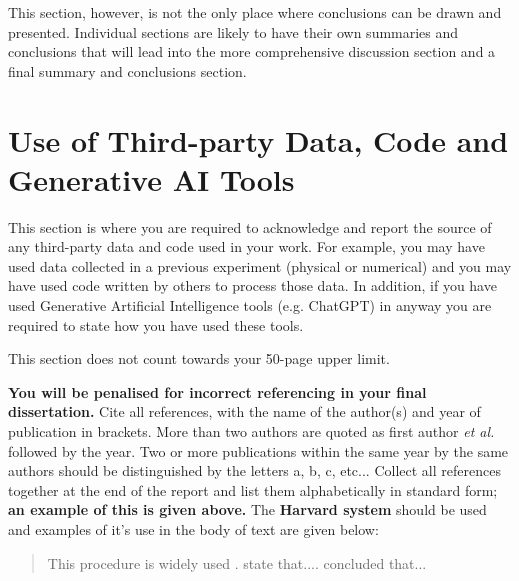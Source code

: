 \documentclass[a4paper,12pt]{article}
\begin{document}
This section, however, is not the only place where conclusions can be drawn and presented.  Individual sections are likely to have their own summaries and conclusions that will lead into the more comprehensive discussion section and a final summary and conclusions section.


\clearpage

\section{Use of Third-party Data, Code and Generative AI Tools}
\label{sec:DCG_Usaage}

This section is where you are required to acknowledge and report the source of any third-party data and code used in your work. For example, you may have used data collected in a previous experiment (physical or numerical) and you may have used code written by others to process those data. In addition, if you have used Generative Artificial Intelligence tools (e.g. ChatGPT) in anyway you are required to state how you have used these tools.

This section does not count towards your 50-page upper limit.

\clearpage





\vspace*{10mm}

\textbf{You will be penalised for incorrect referencing in your final dissertation.} Cite all references, with the name of the author(s) and year of publication in brackets. More than
two authors are quoted as first author \textit{et al.} followed by the year.  Two or more publications within
the same year by the same authors should be distinguished by the letters a, b, c, etc... Collect all
references together at the end of the report and list them alphabetically in standard form; \textbf{an
example of this is given above.} The \textbf{Harvard system} should be used and examples of it’s use in the body of text are given below:


\begin{quote}
This procedure is widely used \citep{Christou2009,Wu2016,Hughes2016a,Hughes2016b}. \citet{Christou2014} state that.... \citet{Spinneken2009a,Spinneken2009b} concluded that...
\end{quote}
\end{document}
